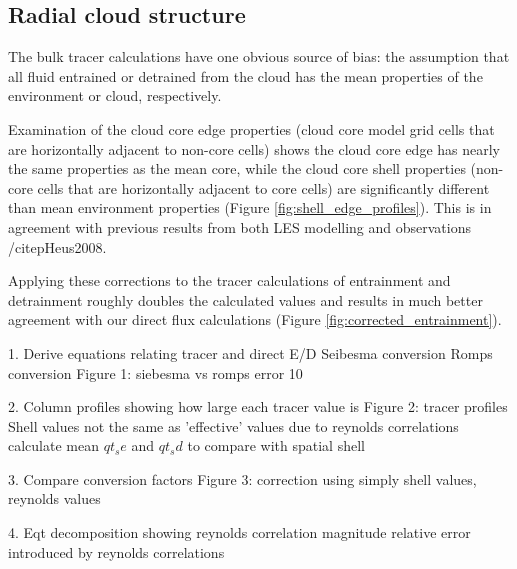\documentclass[draft,grl]{agutex}
\begin{document}
\begin{article}




\section{Radial cloud structure}

The bulk tracer calculations have one obvious source of bias: the assumption 
that all fluid entrained or detrained from the cloud has the mean properties of 
the environment or cloud, respectively.  

Examination of the cloud core edge properties (cloud core model grid cells 
that are horizontally adjacent to non-core cells) shows the cloud core edge has 
nearly the same properties as the mean core, while the cloud core shell 
properties (non-core cells that are horizontally adjacent to core cells) 
are significantly different than mean environment properties (Figure 
\ref{fig:shell_edge_profiles}).  This is in agreement with previous results 
from both LES modelling and observations /citep{Heus2008}.





Applying these corrections to the tracer calculations of entrainment and 
detrainment roughly doubles the calculated values and results in much better 
agreement with our direct flux calculations (Figure 
\ref{fig:corrected_entrainment}).



1. Derive equations relating tracer and direct E/D
  Seibesma conversion
  Romps conversion
	Figure 1: siebesma vs romps error
  10%

2. Column profiles showing how large each tracer value is
    Figure 2: tracer profiles
    Shell values not the same as 'effective' values due to reynolds correlations
    calculate mean $qt_se$ and $qt_sd$ to compare with spatial shell

3. Compare conversion factors
    Figure 3: correction using simply shell values, reynolds values

4. Eqt decomposition showing reynolds correlation magnitude
    relative error introduced by reynolds correlations




\end{article}
\end{document}
